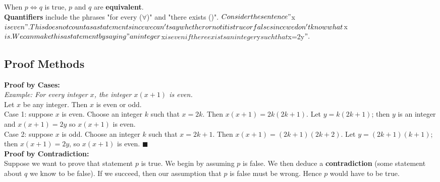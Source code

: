         \noindent When $p\iff q$ is true, $p$ and $q$ are \textbf{equivalent}. \\

        \noindent \textbf{Quantifiers} include the phrases "for every ($\forall$)" and
        "there exists (\exists)". $Consider the sentence "$x$ is even". This does not count
        as a statement since we can't say whether or not it is true or false since we don't
        know what $x$ is. We can make this a statement by saying "an integer $x$ is even if
        there exists an integer $y$ such that $x=2y$".$



    \subsection{Proof Methods}
        \noindent \color{purple} \textbf{Proof by Cases:} \color{black} \\
        \color{blue} \textit{Example: For every integer $x$, the integer $x(x+1)$ is even.} \color{black}  \\
        Let $x$ be any integer. Then $x$ is even or odd. \\
        Case 1: suppose $x$ is even. Choose an integer $k$ such that $x=2k$. Then $x(x+1)=2k(2k+1)$.
        Let $y=k(2k+1)$; then $y$ is an integer and $x(x+1)=2y$ so $x(x+1)$ is even. \\
        Case 2: suppose $x$ is odd. Choose an integer $k$ such that $x=2k+1$. Then
        $x(x+1)=(2k+1)(2k+2)$. Let $y=(2k+1)(k+1)$; then $x(x+1)=2y$, so $x(x+1)$ is even.
        $\blacksquare$ \\

        \noindent \color{purple} \textbf{Proof by Contradiction:} \color{black} \\
        Suppose we want to prove that statement $p$ is true. We begin by assuming $p$ is false.
        We then deduce a \textbf{contradiction} (some statement about $q$ we know to be false).
        If we succeed, then our assumption that $p$ is false must be wrong. Hence $p$ would have
        to be true.